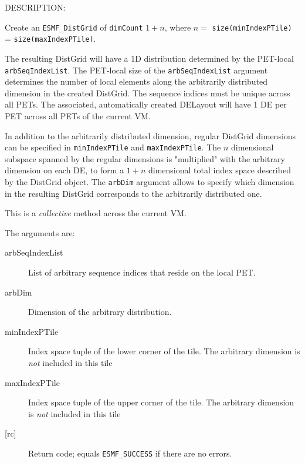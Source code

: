 {\sf DESCRIPTION:\\ }


       Create an {\tt ESMF\_DistGrid} of {\tt dimCount} $1+n$, where 
       $n=$ {\tt size(minIndexPTile)} = {\tt size(maxIndexPTile)}.
  
       The resulting DistGrid will have a 1D distribution determined by the
       PET-local {\tt arbSeqIndexList}. The PET-local size of the
       {\tt arbSeqIndexList} argument determines the number of local elements 
       along the arbitrarily distributed dimension in the created DistGrid. The
       sequence indices must be unique across all PETs. The associated,
       automatically created DELayout will have 1 DE per PET across all PETs of
       the current VM.
  
       In addition to the arbitrarily distributed dimension, regular DistGrid
       dimensions can be specified in {\tt minIndexPTile} and {\tt maxIndexPTile}. The
       $n$ dimensional subspace spanned by the regular dimensions is "multiplied"
       with the arbitrary dimension on each DE, to form a $1+n$ dimensional
       total index space described by the DistGrid object. The {\tt arbDim}
       argument allows to specify which dimension in the resulting DistGrid
       corresponds to the arbitrarily distributed one.
  
       This is a {\em collective} method across the current VM.
  
       The arguments are:
       \begin{description}
       \item[arbSeqIndexList]
            List of arbitrary sequence indices that reside on the local PET.
       \item[arbDim]
            Dimension of the arbitrary distribution.
       \item[minIndexPTile]
            Index space tuple of the lower corner of the tile. The 
            arbitrary dimension is {\em not} included in this tile
       \item[maxIndexPTile]
            Index space tuple of the upper corner of the tile. The
            arbitrary dimension is {\em not} included in this tile
       \item[{[rc]}]
            Return code; equals {\tt ESMF\_SUCCESS} if there are no errors.
       \end{description}
   
 
\mbox{}\hrulefill\ 
 
